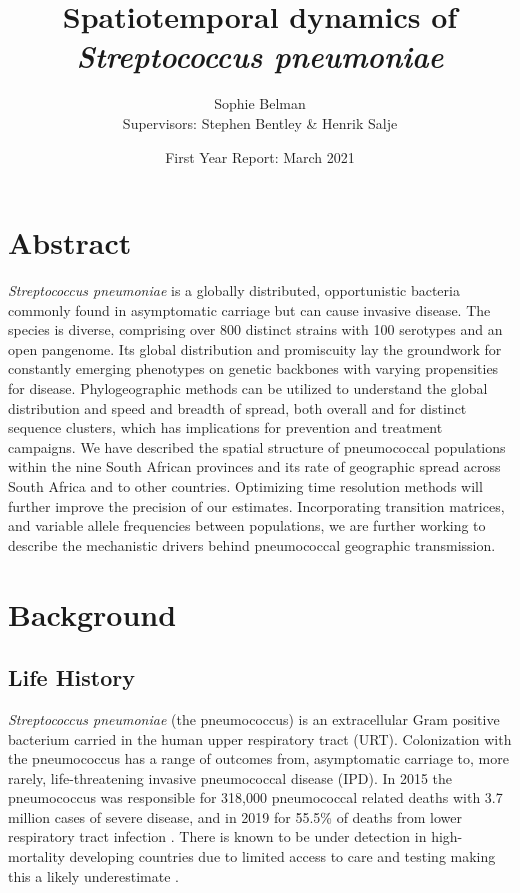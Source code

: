 \documentclass{article}
\title{Spatiotemporal dynamics of \\ \textit{Streptococcus pneumoniae}}
\author{Sophie Belman \\ Supervisors: Stephen Bentley \& Henrik Salje}
\date{First Year Report: March 2021}
\begin{document}
\maketitle

\section{Abstract}
\textit{Streptococcus pneumoniae} is a globally distributed, opportunistic bacteria commonly found in asymptomatic carriage but can cause invasive disease. The species is diverse, comprising over 800 distinct strains with 100 serotypes and an open pangenome. Its global distribution and promiscuity lay the groundwork for constantly emerging phenotypes on genetic backbones with varying propensities for disease. Phylogeographic methods can be utilized to understand the global distribution and speed and breadth of spread, both overall and for distinct sequence clusters, which has implications for prevention and treatment campaigns. We have described the spatial structure of pneumococcal populations within the nine South African provinces and its rate of geographic spread across South Africa and to other countries. Optimizing time resolution methods will further improve the precision of our estimates. Incorporating transition matrices, and variable allele frequencies between populations, we are further working to describe the mechanistic drivers behind pneumococcal geographic transmission. 
\section{Background}
\subsection{Life History}
\textit{Streptococcus pneumoniae} (the pneumococcus) is an extracellular Gram positive bacterium carried in the human upper respiratory tract (URT). Colonization with the pneumococcus has a range of outcomes from, asymptomatic carriage to, more rarely, life-threatening invasive pneumococcal disease (IPD)\cite{weiserStreptococcusPneumoniaeTransmission2018}. In 2015 the pneumococcus was responsible for 318,000 pneumococcal related deaths with 3.7 million cases of severe disease, and in 2019 for 55.5\% of deaths from lower respiratory tract infection  \cite{wahlBurdenStreptococcusPneumoniae2018,murrayFiveInsightsGlobal2020}. There is known to be under detection in high-mortality developing countries due to limited access to care and testing making this a likely underestimate \cite{obrienBurdenDiseaseCaused2009,troegerEstimatesGlobalRegional2017}. 
\end{document}
